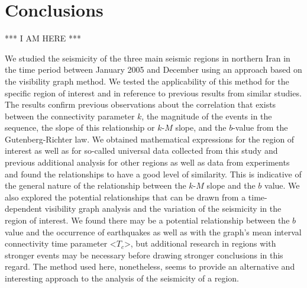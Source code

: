 
\section{Conclusions}

*** I AM HERE ***

We studied the seismicity of the three main seismic regions in northern Iran in the time period between January 2005 and December  using an approach based on the visibility graph method. We tested the applicability of this method for the specific region of interest and in reference to previous results from similar studies. The results confirm previous observations about the correlation that exists between the connectivity parameter $k$, the magnitude of the events in the sequence, the slope of this relationship or $k$-$M$ slope, and the $b$-value from the Gutenberg-Richter law. We obtained mathematical expressions for the region of interest as well as for so-called universal data collected from this study and previous additional analysis for other regions as well as data from experiments and found the relationships to have a good level of similarity. This is indicative of the general nature of the relationship between the $k$-$M$ slope and the $b$ value.  We also explored the potential relationships that can be drawn from a time-dependent visibility graph analysis and the variation of the seismicity in the region of interest. We found there may be a potential relationship between the $b$ value and the occurrence of earthquakes as well as with the graph's mean interval connectivity time parameter <$T_c$>, but additional research in regions with stronger events may be necessary before drawing stronger conclusions in this regard.  The method used here, nonetheless, seems to provide an alternative and interesting approach to the analysis of the seismicity of a region. 


